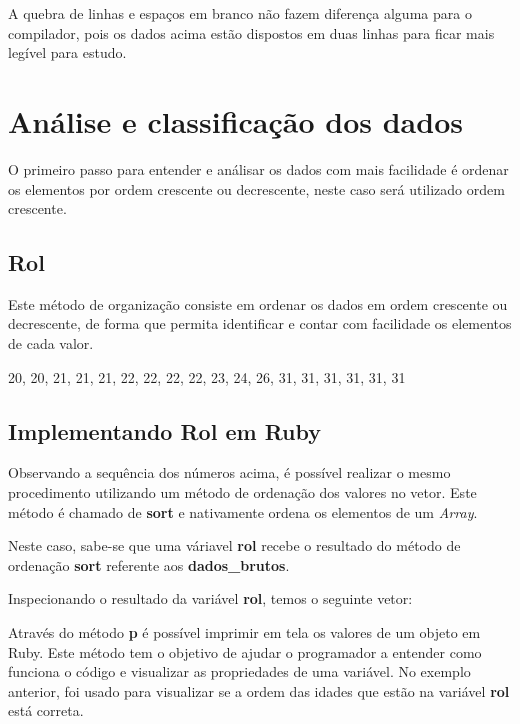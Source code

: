 \documentclass[12pt]{article}
\newcommand{\code}[1] {\textbf{#1}}
\begin{document}
A quebra de linhas e espaços em branco não fazem diferença alguma para o compilador, pois os dados acima estão dispostos em duas linhas para ficar mais legível para estudo.


\section { Análise e classificação dos dados }

O primeiro passo para entender e análisar os dados com mais facilidade é ordenar os elementos por ordem crescente ou decrescente, neste caso será utilizado ordem crescente. 

\subsection { Rol }

Este método de organização consiste em ordenar os dados em ordem crescente ou decrescente, de forma que permita identificar e contar com facilidade os elementos de cada valor.

20, 20, 21, 21, 21, 22, 22, 22, 22, 23, 24, 26, 31, 31, 31, 31, 31, 31

\subsection { Implementando Rol em Ruby }

Observando a sequência dos números acima, é possível realizar o mesmo procedimento utilizando um método de ordenação dos valores no vetor. Este método é chamado de \code{sort} e nativamente ordena os elementos de um \textit{Array}.

 

Neste caso, sabe-se que uma váriavel \code{rol} recebe o resultado do método de ordenação \code{sort} referente aos \code{dados\_brutos}.

Inspecionando o resultado da variável \code{rol}, temos o seguinte vetor:

 

Através do método \code{p} é possível imprimir em tela os valores de um objeto em Ruby. Este método tem o objetivo de ajudar o programador a entender como funciona o código e visualizar as propriedades de uma variável. No exemplo anterior, foi usado para visualizar se a ordem das idades que estão na variável \code{rol} está correta.
\end{document}
